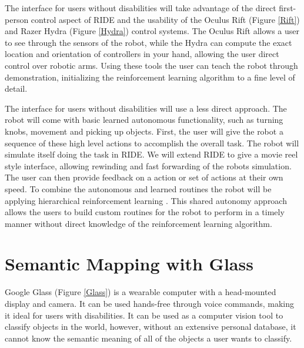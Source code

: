 \documentclass[letterpaper]{article}
\begin{document}
The interface for users without disabilities will take advantage of the direct first-person control aspect of RIDE and the usability of the Oculus Rift (Figure \ref{Rift}) and Razer Hydra (Figure \ref{Hydra}) control systems. The Oculus Rift allows a user to see through the sensors of the robot, while the Hydra can compute the exact location and orientation of controllers in your hand, allowing the user direct control over robotic arms. Using these tools the user can teach the robot through demonstration, initializing the reinforcement learning algorithm to a fine level of detail.

The interface for users without disabilities will use a less direct approach. The robot will come with basic learned autonomous functionality, such as turning knobs, movement and picking up objects. First, the user will give the robot a sequence of these high level actions to accomplish the overall task. The robot will simulate itself doing the task in RIDE. We will extend RIDE to give a movie reel style interface, allowing rewinding and fast forwarding of the robots simulation. The user can then provide feedback on a action or set of actions at their own speed. To combine the autonomous and learned routines the robot will be applying hierarchical reinforcement learning  \cite{Barto:2003:RAH:608557.608576}. This shared autonomy approach allows the users to build custom routines for the robot to perform in a timely manner without direct knowledge of the reinforcement learning algorithm.

\section{Semantic Mapping with Glass}
\label{Object Classification}
Google Glass (Figure \ref{Glass}) is a wearable computer with a head-mounted display and camera. It can be used hands-free through voice commands, making it ideal for users with disabilities. It can be used as a computer vision tool to classify objects in the world, however, without an extensive personal database, it cannot know the semantic meaning of all of the objects a user wants to classify. 
\end{document}
